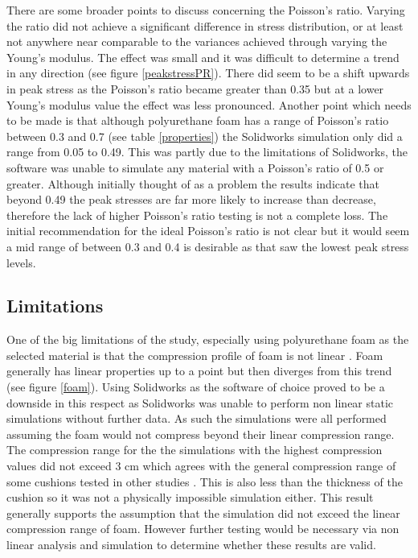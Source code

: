 \documentclass[conference]{IEEEtran}
\begin{document}
There are some broader points to discuss concerning the Poisson's ratio. Varying the ratio did not achieve a significant difference in stress distribution, or at least not anywhere near comparable to the variances achieved through varying the Young's modulus. The effect was small and it was difficult to determine a trend in any direction (see figure \ref{peakstressPR}). There did seem to be a shift upwards in peak stress as the Poisson's ratio became greater than 0.35 but at a lower Young's modulus value the effect was less pronounced. Another point which needs to be made is that although polyurethane foam has a range of Poisson's ratio between 0.3 and 0.7 (see table \ref{properties}) the Solidworks simulation only did a range from 0.05 to 0.49. This was partly due to the limitations of Solidworks, the software was unable to simulate any material with a Poisson's ratio of 0.5 or greater. Although initially thought of as a problem the results indicate that beyond 0.49 the peak stresses are far more likely to increase than decrease, therefore the lack of higher Poisson's ratio testing is not a complete loss. The initial recommendation for the ideal Poisson's ratio is not clear but it would seem a mid range of between 0.3 and 0.4 is desirable as that saw the lowest peak stress levels.


    \subsection{Limitations}
    One of the big limitations of the study, especially using polyurethane foam as the selected material is that the compression profile of foam is not linear \cite{Iddamalgoda2011}. Foam generally has linear properties up to a point but then diverges from this trend (see figure \ref{foam}). Using Solidworks as the software of choice proved to be a downside in this respect as Solidworks was unable to perform non linear static simulations without further data. As such the simulations were all performed assuming the foam would not compress beyond their linear compression range. The compression range for the the simulations with the highest compression values did not exceed 3 cm which agrees with the general compression range of some cushions tested in other studies \cite{drury1982}. This is also less than the thickness of the cushion so it was not a physically impossible simulation either. This result generally supports the assumption that the simulation did not exceed the linear compression range of foam. However further testing would be necessary via non linear analysis and simulation to determine whether these results are valid.
    
\end{document}
